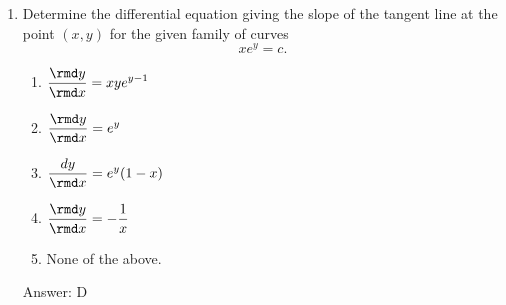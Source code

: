 \begin{enumerate}
\item Determine the differential equation giving the slope of the tangent
  line at the point $(x,y)$ for the given family of curves
  $$xe^y=c.$$
\begin{enumerate}[label=\alph*)]
\item $\displaystyle\frac{\rmd y}{\rmd x}=xye^{y-1}$ \\
\item $\displaystyle\frac{\rmd y}{\rmd x}=e^y$ \\
\item $\displaystyle\frac{dy}{\rmd x}=e^y(1-x)$ \\
\item $\displaystyle\frac{\rmd y}{\rmd x}=-\frac{1}{x}$ \\
\item None of the above.
\end{enumerate}
Answer: D
\vspace{2.3 in}
\end{enumerate}

